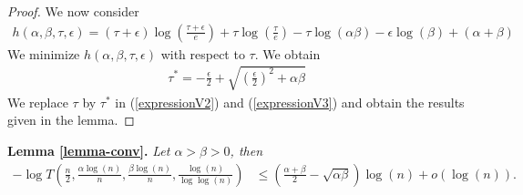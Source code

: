 \documentclass[english]{article}
\newcommand{\1}{\textbf{1}}
\newcommand{\pp}{\frac{\alpha\log(n)}{n}}
\newcommand{\qq}{\frac{\beta\log(n)}{n}}
\begin{document}
\begin{proof}
\noindent We now consider
\begin{align}
h(\alpha, \beta,\tau,\epsilon)=(\tau +\epsilon) \log \left( \frac{\tau +\epsilon}{e}\right) +\tau \log \left( \frac{\tau}{e}\right) - \tau \log(\alpha \beta) -\epsilon \log(\beta) +(\alpha +\beta)
\end{align}
We minimize $h(\alpha,\beta,\tau,\epsilon)$ with respect to $\tau$. We obtain
\begin{align}
\tau^*= -\frac{\epsilon}{2} +\sqrt{\left(\frac{\epsilon}{2} \right)^2+\alpha \beta}
\end{align}
We replace $\tau$ by $\tau^*$ in (\ref{expressionV2}) and (\ref{expressionV3}) and obtain the results given in the lemma.
\end{proof}















\noindent
{\bf Lemma \ref{lemma-conv}.}
{\it Let $\alpha>\beta>0$, then
\begin{align}
 -\log T\left(\frac{n}2,\pp, \qq , \frac{\log(n)}{\log\log(n)}\right)  &\leq   \left( \frac{\alpha + \beta}2 - \sqrt{\alpha \beta} \right) \log(n) +o\left(\log (n)\right). 
\end{align}}
\end{document}
